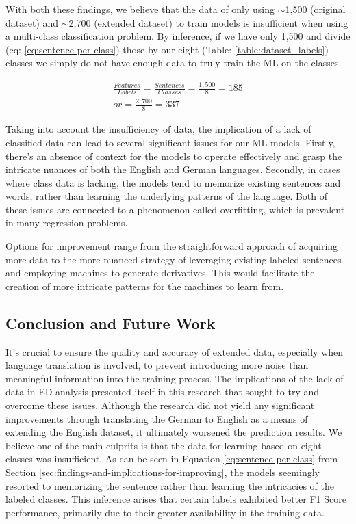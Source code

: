\documentclass[11pt]{article}
\begin{document}
With both these findings, we believe that the data of only using $\sim$1,500 (original dataset) and $\sim$2,700 (extended dataset) to train models is insufficient\cite{overfitting-overview} when using a multi-class classification problem. By inference, if we have only 1,500 and divide (eq: \ref{eq:sentence-per-class}) those by our eight (Table: \ref{table:dataset_labels}) classes we simply do not have enough data to truly train the ML on the classes.

\begin{equation}
\begin{split}
\frac{Features}{Labels}= \frac{Sentences}{Classes}=\frac{1,500}{8}=185 \\
or=\frac{2,700}{8}=337
\end{split}
\label{eq:sentence-per-class}
\end{equation}

Taking into account the insufficiency of data, the implication of a lack of classified data can lead to several significant issues for our ML models. Firstly, there's an absence of context for the models to operate effectively and grasp the intricate nuances of both the English and German languages. Secondly, in cases where class data is lacking, the models tend to memorize existing sentences and words, rather than learning the underlying patterns of the language. Both of these issues are connected to a phenomenon called overfitting\cite{overfitting-overview}, which is prevalent in many regression problems.

Options for improvement range from the straightforward approach of acquiring more data to the more nuanced strategy of leveraging existing labeled sentences and employing machines to generate derivatives. This would facilitate the creation of more intricate patterns for the machines to learn from. 

\subsection{Conclusion and Future Work}
It's crucial to ensure the quality and accuracy of extended data, especially when language translation is involved, to prevent introducing more noise than meaningful information into the training process. The implications of the lack of data in ED analysis presented itself in this research that sought to try and overcome these issues. Although the research did not yield any significant improvements through translating the German to English as a means of extending the English dataset, it ultimately worsened the prediction results. We believe one of the main culprits is that the data for learning based on eight classes was insufficient. As can be seen in Equation \ref{eq:sentence-per-class} from Section \ref{sec:findings-and-implications-for-improving}, the models seemingly resorted to memorizing the sentence rather than learning the intricacies of the labeled classes. This inference arises that certain labels exhibited better F1 Score performance, primarily due to their greater availability in the training data.
\end{document}
